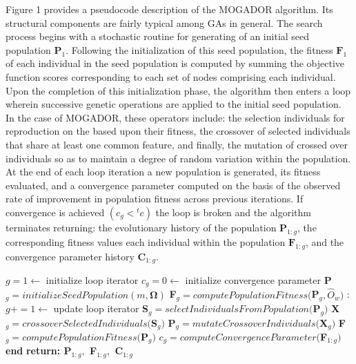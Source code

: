 Figure 1 provides a pseudocode description of the MOGADOR algorithm. Its structural components are fairly typical among GAs in general. The search process begins with a stochastic routine for generating of an initial seed population $\textbf{P}_1$. Following the initialization of this seed population, the fitness $\textbf{F}_1$ of each individual in the seed population is computed by summing the objective function scores corresponding to each set of nodes comprising each individual. Upon the completion of this initialization phase, the algorithm then enters a loop wherein successive genetic operations are applied to the initial seed population. In the case of MOGADOR, these operators include: the selection individuals for reproduction on the based upon their fitness, the crossover of selected individuals that share at least one common feature, and finally, the mutation of crossed over individuals so as to maintain a degree of random variation within the population. At the end of each loop iteration a new population is generated, its fitness evaluated, and a convergence parameter computed on the basis of the observed rate of improvement in population fitness across previous iterations. If convergence is achieved $(c_g < {}^{t}c)$ the loop is broken and the algorithm terminates returning: the evolutionary history of the population $\textbf{P}_{1:g}$, the corresponding fitness values each individual within the population $\textbf{F}_{1:g}$, and the convergence parameter history $\textbf{C}_{1:g}$. \\

                \begin{algorithm}
                \caption{}\label{euclid}
                \begin{algorithmic}[1]
                \State $g = 1 \gets$ initialize loop iterator
                \State $c_g = 0 \gets$ initialize convergence parameter
                \State \textbf{P}$_g = initializeSeedPopulation(m,\boldsymbol\Omega)$
                \State \textbf{F}$_g = computePopulationFitness($\textbf{P}$_g,\hat{O}_w)$ 
                :
                \State $g += 1 \gets$ update loop iterator
                \State \textbf{S}$_g = selectIndividualsFromPopulation($\textbf{P}$_g)$
                \State \textbf{X}$_g = crossoverSelectedIndividuals($\textbf{S}$_g)$
                \State \textbf{P}$_g = mutateCrossoverIndividuals($\textbf{X}$_g)$
                \State \textbf{F}$_g = computePopulationFitness($\textbf{P}$_g)$
                \State $c_g = computeConvergenceParameter($\textbf{F}$_{1:g})$
                \State \textbf{end}
                \EndWhile
                \State \textbf{return: \textbf{P}$_{1:g},$ \textbf{F}$_{1:g},$ \textbf{C}$_{1:g}$}
                \EndProcedure
                \end{algorithmic}
                \end{algorithm}
                
